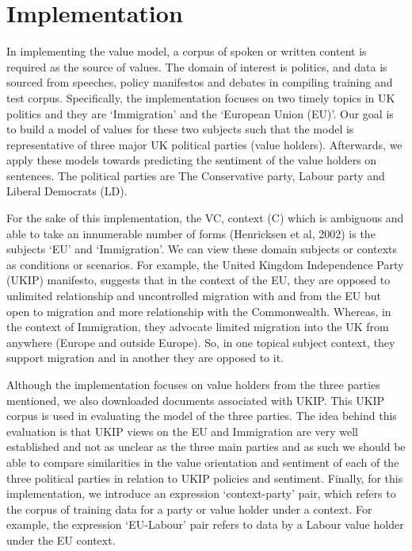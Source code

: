 \section{Implementation}\label{sec:implementation}
In implementing the value model, a corpus of spoken or written content is required as the source of values. The domain of interest is politics, and data is sourced from speeches, policy manifestos and debates in compiling training and test corpus. Specifically, the implementation focuses on two timely topics in UK politics and they are `Immigration' and the `European Union (EU)'. Our goal is to build a model of values for these two subjects such that the model is representative of three major UK political parties (value holders). Afterwards, we apply these models towards predicting the sentiment of the value holders on sentences. The political parties are The Conservative party, Labour party and Liberal Democrats (LD). 


For the sake of this implementation, the VC, context (C) which is ambiguous and able to take an innumerable number of forms (Henricksen et al, 2002) is the subjects `EU' and `Immigration'. We can view these domain subjects or contexts as conditions or scenarios. For example, the United Kingdom Independence Party (UKIP) manifesto, suggests that in the context of the EU, they are opposed to unlimited relationship and uncontrolled migration with and from the EU but open to migration and more relationship with the Commonwealth. Whereas, in the context of Immigration, they advocate limited migration into the UK from anywhere (Europe and outside Europe). So, in one topical subject context, they support migration and in another they are opposed to it.


Although the implementation focuses on value holders from the three parties mentioned, we also downloaded documents associated with UKIP. This UKIP corpus is used in evaluating the model of the three parties. The idea behind this evaluation is that UKIP views on the EU and Immigration are very well established and not as unclear as the three main parties and as such we should be able to compare similarities in the value orientation and sentiment of each of the three political parties in relation to UKIP policies and sentiment. Finally, for this implementation, we introduce an expression `context-party' pair, which refers to the corpus of training data for a party or value holder under a context. For example, the expression `EU-Labour' pair refers to data by a Labour value holder under the EU context. 

